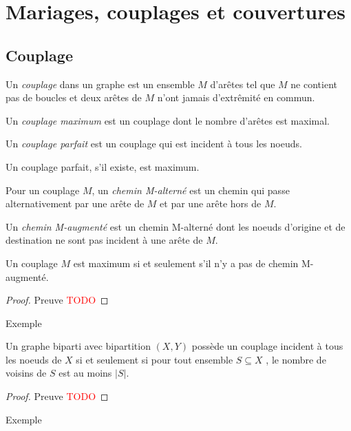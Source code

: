 \section{Mariages, couplages et couvertures}
\subsection{Couplage}
\begin{mydef}
  Un \emph{couplage} dans un graphe est un ensemble $M$ d’arêtes tel que $M$ ne contient pas de boucles et deux arêtes de $M$ n’ont jamais d’extrêmité en commun.
\end{mydef}

\begin{mydef}
  Un \emph{couplage maximum} est un couplage dont le nombre d’arêtes est maximal.
\end{mydef}

\begin{mydef}
  Un \emph{couplage parfait} est un couplage qui est incident à tous les noeuds.
\end{mydef}

\begin{myrem}
  Un couplage parfait, s’il existe, est maximum.
\end{myrem}

\begin{mydef}
  Pour un couplage $M$, un \emph{chemin M-alterné} est un chemin qui passe alternativement par une arête de $M$ et par une arête hors de $M$.
\end{mydef}

\begin{mydef}
  Un \emph{chemin M-augmenté} est un chemin M-alterné dont les noeuds d’origine et de destination ne sont pas incident à une arête de $M$.
\end{mydef}

\begin{mytheo} [Berge]
  Un couplage $M$ est maximum si et seulement s’il n’y a pas de chemin M-augmenté.
  \begin{proof}
     Preuve \textcolor{red}{TODO}
  \end{proof}
\end{mytheo}
\begin{myexem}
  Exemple
\end{myexem}

\begin{mytheo} 
  Un graphe biparti avec bipartition $(X , Y)$ possède un couplage incident à tous les noeuds de $X$ si et seulement si pour tout ensemble $S \subseteq X$ , le nombre de voisins de $S$ est au moins $|S|$.
  \begin{proof}
     Preuve \textcolor{red}{TODO}
  \end{proof}
\end{mytheo}
\begin{myexem}
  Exemple
\end{myexem}

